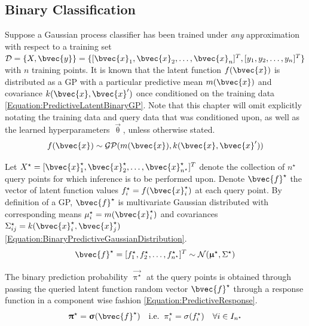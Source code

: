 		\subsection{Binary Classification}
		\label{InformativeSeafloorExploration:MCPIE:Binary}
		
			Suppose a Gaussian process classifier has been trained under \textit{any} approximation with respect to a training set $\mathcal{D} = \{X, \bvec{y}\} = \{[ \bvec{x}_{1}, \bvec{x}_{2}, \dots, \bvec{x}_{n}]^{T}, [y_{1}, y_{2}, \dots, y_{n}]^{T}\}$ with $n$ training points. It is known that the latent function $f(\bvec{x})$ is distributed as a GP with a particular predictive mean $m(\bvec{x})$ and covariance $k(\bvec{x}, \bvec{x}')$ once conditioned on the training data \eqref{Equation:PredictiveLatentBinaryGP}. Note that this chapter will omit explicitly notating the training data and query data that was conditioned upon, as well as the learned hyperparameters $\vec{\uptheta}$, unless otherwise stated. \begin{equation}
				f(\bvec{x}) \sim \mathcal{GP}(m(\bvec{x}), k(\bvec{x}, \bvec{x}'))
			\label{Equation:PredictiveLatentBinaryGP}
			\end{equation}
			
			Let $X^{\star} = [ \bvec{x}^{\star}_{1}, \bvec{x}^{\star}_{2}, \dots, \bvec{x}^{\star}_{n^{\star}}]^{T}$ denote the collection of $n^{\star}$ query points for which inference is to be performed upon. Denote $\bvec{f}^{\star}$ the vector of latent function values $f^{\star}_{i} = f(\bvec{x}^{\star}_{i})$ at each query point. By definition of a GP, $\bvec{f}^{\star}$ is multivariate Gaussian distributed with corresponding means $\mu^{\star}_{i} = m(\bvec{x}^{\star}_{i})$ and covariances $\Sigma^{\star}_{ij} = k(\bvec{x}^{\star}_{i}, \bvec{x}^{\star}_{j})$ \eqref{Equation:BinaryPredictiveGaussianDistribution}. \begin{equation}
				\bvec{f}^{\star} = [f^{\star}_{1}, f^{\star}_{2}, \dots, f^{\star}_{n^{\star}}]^{T} \sim \mathcal{N}(\vec{\upmu}^{\star}, \Sigma^{\star})
			\label{Equation:BinaryPredictiveGaussianDistribution}
			\end{equation}
				
			The binary prediction probability $\vec{\uppi^{\star}}$ at the query points is obtained through passing the queried latent function random vector $\bvec{f}^{\star}$ through a response function in a component wise fashion \eqref{Equation:PredictiveResponse}. \begin{equation}
				\vec{\uppi}^{\star} = \vec{\upsigma}(\bvec{f}^{\star})\mathrm{ \quad i.e. \;\;}\pi^{\star}_{i} = \sigma(f^{\star}_{i}) \quad \forall i \in I_{n^{\star}}
			\label{Equation:PredictiveResponse}
			\end{equation}
			

